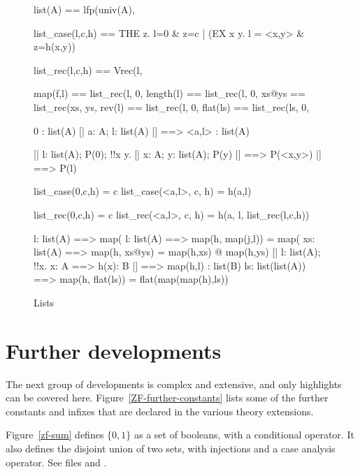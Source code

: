 \begin{figure}\underscoreon %
\begin{ttbox}
        list(A) == lfp(univ(A), %

   list_case(l,c,h) ==
                THE z. l=0 & z=c | (EX x y. l = <x,y> & z=h(x,y))

    list_rec(l,c,h) == 
                Vrec(l, %

         map(f,l)  == list_rec(l,  0,  %
      length(l) == list_rec(l,  0,  %
         xs@ys     == list_rec(xs, ys, %
         rev(l)    == list_rec(l,  0,  %
        flat(ls)  == list_rec(ls, 0,  %

         0 : list(A)
      [| a: A;  l: list(A) |] ==> <a,l> : list(A)

    [| l: list(A);
       P(0);
       !!x y. [| x: A;  y: list(A);  P(y) |] ==> P(<x,y>)
    |] ==> P(l)

     list_case(0,c,h) = c
  list_case(<a,l>, c, h) = h(a,l)

      list_rec(0,c,h) = c
   list_rec(<a,l>, c, h) = h(a, l, list_rec(l,c,h))

       l: list(A) ==> map(%
     l: list(A) ==> map(h, map(j,l)) = map(%
 xs: list(A) ==> map(h, xs@ys) = map(h,xs) @ map(h,ys)
    [| l: list(A);  !!x. x: A ==> h(x): B |] ==> map(h,l) : list(B)
    ls: list(list(A)) ==> map(h, flat(ls)) = flat(map(map(h),ls))
\end{ttbox}
\caption{Lists} \label{zf-list}
\end{figure}

\section{Further developments}
The next group of developments is complex and extensive, and only
highlights can be covered here.  Figure~\ref{ZF-further-constants} lists
some of the further constants and infixes that are declared in the various
theory extensions.

Figure~\ref{zf-sum} defines $\{0,1\}$ as a set of booleans, with a
conditional operator.  It also defines the disjoint union of two sets, with
injections and a case analysis operator.  See files
 and .

